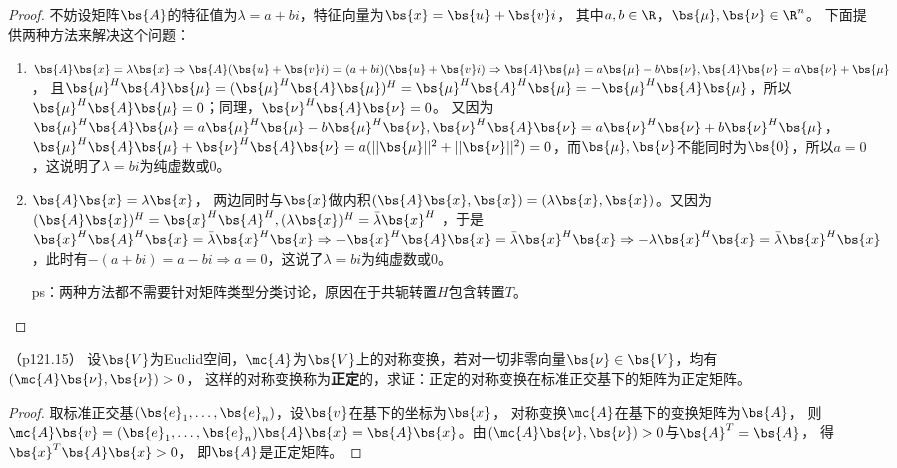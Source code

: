 \documentclass[12pt, a4paper, oneside, UTF8]{ctexbook}
\begin{document}
\begin{proof}
    不妨设矩阵$\bs{A}$的特征值为$\lambda=a+bi$，特征向量为$\bs{x}=\bs{u}+\bs{v}i$，
        其中$a,b \in \R$，$\bs{\mu},\bs{\nu} \in \R^n$。
        下面提供两种方法来解决这个问题：
    \begin{enumerate}[label=(\arabic*)]
        \item     
        $\bs{A}\bs{x}=\lambda\bs{x} \Rightarrow \bs{A}(\bs{u}+\bs{v}i)=(a+bi)(\bs{u}+\bs{v}i) \Rightarrow \bs{A}\bs{\mu}=a\bs{\mu}-b\bs{\nu},\bs{A}\bs{\nu}=a\bs{\nu}+\bs{\mu}$，
        且$\bs{\mu}^H\bs{A}\bs{\mu}=(\bs{\mu}^H\bs{A}\bs{\mu})^H=\bs{\mu}^H\bs{A}^H\bs{\mu}=-\bs{\mu}^H\bs{A}\bs{\mu}$，所以$\bs{\mu}^H\bs{A}\bs{\mu}=0$；同理，$\bs{\nu}^H\bs{A}\bs{\nu}=0$。
        又因为$\bs{\mu}^H\bs{A}\bs{\mu}=a\bs{\mu}^H\bs{\mu}-b\bs{\mu}^H\bs{\nu},\bs{\nu}^H\bs{A}\bs{\nu}=a\bs{\nu}^H\bs{\nu}+b\bs{\nu}^H\bs{\mu}$，
        $\bs{\mu}^H\bs{A}\bs{\mu}+\bs{\nu}^H\bs{A}\bs{\nu}=a(||\bs{\mu}||^2+||\bs{\nu}||^2)=0$，而$\bs{\mu},\bs{\nu}$不能同时为$\bs{0}$，所以$a=0$，这说明了$\lambda=bi$为纯虚数或0。
        \item  $\bs{A}\bs{x}=\lambda\bs{x}$，
        两边同时与$\bs{x}$做内积$(\bs{A}\bs{x},\bs{x})=(\lambda \bs{x},\bs{x})$。又因为$(\bs{A}\bs{x})^H=\bs{x}^H\bs{A}^H,(\lambda\bs{x})^H=\bar{\lambda}\bs{x}^H $
        ，于是$\bs{x}^H\bs{A}^H\bs{x}=\bar{\lambda}\bs{x}^H\bs{x} \Rightarrow -\bs{x}^H\bs{A}\bs{x}=\bar{\lambda}\bs{x}^H\bs{x}
        \Rightarrow -\lambda \bs{x}^H\bs{x}=\bar{\lambda}\bs{x}^H\bs{x}$，此时有$-(a+bi)=a-bi \Rightarrow a=0$，这说了$\lambda=bi$为纯虚数或0。
        
        ps：两种方法都不需要针对矩阵类型分类讨论，原因在于共轭转置$H$包含转置$T$。
    \end{enumerate}
\end{proof}

\begin{question}（p121.15）
    设$\bs{V}$为Euclid空间，$\mc{A}$为$\bs{V}$上的对称变换，若对一切非零向量$\bs{\nu} \in \bs{V}$，均有$(\mc{A}\bs{\nu},\bs{\nu}) > 0$，
    这样的对称变换称为\textbf{正定}的，求证：正定的对称变换在标准正交基下的矩阵为正定矩阵。
\end{question}

\begin{proof}
    取标准正交基$(\bs{e}_1,\ldots,\bs{e}_n)$，设$\bs{v}$在基下的坐标为$\bs{x}$，
    对称变换$\mc{A}$在基下的变换矩阵为$\bs{A}$，
    则$\mc{A}\bs{v}=(\bs{e}_1,\ldots,\bs{e}_n)\bs{A}\bs{x}=\bs{A}\bs{x}$。由$(\mc{A}\bs{\nu},\bs{\nu}) > 0$与$\bs{A}^T=\bs{A}$，
    得$\bs{x}^T\bs{A}\bs{x}>0$，
    即$\bs{A}$是正定矩阵。

\end{proof}
\end{document}
